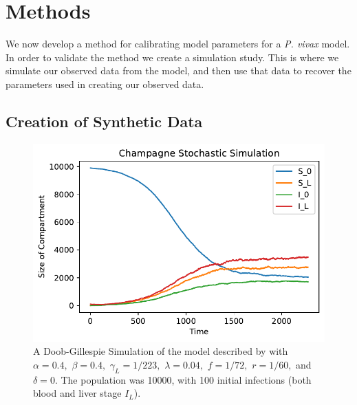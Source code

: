 \chapter{Methods}

We now develop a method for calibrating model parameters for a \emph{P. vivax}
model. In order to validate the method we create a simulation study. This is
where we simulate our observed data from the model, and then use that data
to recover the parameters used in creating our observed data.

\section{Creation of Synthetic Data}

\begin{figure}[htbp]
    \centering
    \includegraphics[width = \textwidth]{
        ../champagne_GP_images/champagne_simulation.pdf
    }
    \caption{
        A Doob-Gillespie Simulation of the model described by
        \cite{champagne_using_2022} with $\alpha = 0.4,$ $\beta = 0.4,$
        $\gamma_L = 1 / 223,$ $\lambda = 0.04,$ $f = 1 / 72,$ $r = 1 / 60,$ and
        $\delta = 0.$ The population was 10000, with 100 initial infections
        (both blood and liver stage $I_L$).
    }
    \label{fig:champ_doob}
\end{figure}

